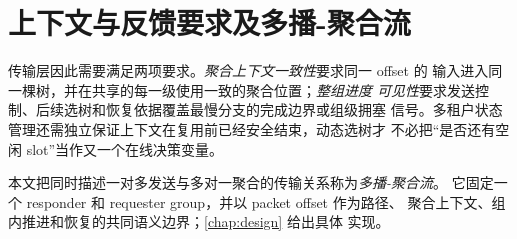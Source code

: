 \section{上下文与反馈要求及多播-聚合流}
\label{ssec:inc-limits}

传输层因此需要满足两项要求。\emph{聚合上下文一致性}要求同一 offset 的
输入进入同一棵树，并在共享的每一级使用一致的聚合位置；\emph{整组进度
可见性}要求发送控制、后续选树和恢复依据覆盖最慢分支的完成边界或组级拥塞
信号。多租户状态管理还需独立保证上下文在复用前已经安全结束，动态选树才
不必把``是否还有空闲 slot''当作又一个在线决策变量。

本文把同时描述一对多发送与多对一聚合的传输关系称为\emph{多播-聚合流}。
它固定一个 responder 和 requester group，并以 packet offset 作为路径、
聚合上下文、组内推进和恢复的共同语义边界；\cref{chap:design} 给出具体
实现。
